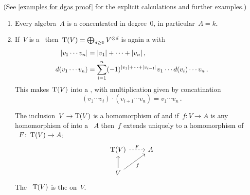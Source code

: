 \documentclass[a4paper,10pt,headings=standardclasses]{scrartcl}
\begin{document}
\begin{examples}
  \label{examples for dgas}
  (See \cref{examples for dgas proof} for the explicit calculations and further examples.)
  \begin{enumerate}
    \item
      Every algebra~$A$ is a {\dga} concentrated in degree~$0$, in particular~$A = k$.
    \item
      If~$V$ is a~{\dgv} then~$\operatorname{T}(V) = \bigoplus_{d \geq 0} V^{\otimes d}$ is again a {\dgv} with
      \begin{align*}
        \lvert v_1 \dotsm v_n\rvert
        &=
        \lvert v_1\rvert + \dotsb + \lvert v_n\rvert \,,
      \\
        d(v_1 \dotsm v_n)
        &=
        \sum_{i=1}^n
        (-1)^{\lvert v_1\rvert + \dotsb + \lvert v_{i-1}\rvert}
        v_1 \dotsm d(v_i) \dotsm v_n \,.
      \end{align*}
      This makes~$\operatorname{T}(V)$ into a {\dga}, with multiplication given by concatination
      \[
        (v_1 \dotsm v_i) \cdot (v_{i+1} \dotsm v_n)
        =
        v_1 \dotsm v_n \,.
      \]

      The inclusion~$V \to \operatorname{T}(V)$ is a homomorphism of {\dgvs} and if~$f \colon V \to A$ is any homomorphism of {\dgvs} into a {\dga}~$A$ then~$f$ extends uniquely to a homomorphism of {\dgas}~$F \colon \operatorname{T}(V) \to A$:
      \[
        \begin{tikzcd}
          \dgTensor(V)
          \arrow[dashed]{r}[above]{F}
          &
          A
          \\
          V
          \arrow{u}
          \arrow{ur}[below right]{f}
          &
          {}
        \end{tikzcd}
      \]
      The {\dga}~$\operatorname{T}(V)$ is the  on~$V$.
  \end{enumerate}
\end{examples}
\end{document}
